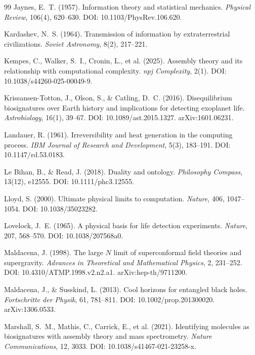 \documentclass[12pt, a4paper]{article}
\begin{document}
\begin{thebibliography}{99}
Jaynes, E.~T. (1957). Information theory and statistical mechanics. \textit{Physical Review},
106(4), 620--630. DOI: 10.1103/PhysRev.106.620.

Kardashev, N.~S. (1964). Transmission of information by extraterrestrial civilizations.
\textit{Soviet Astronomy}, 8(2), 217--221.

Kempes, C., Walker, S.~I., Cronin, L., et al. (2025). Assembly theory and its relationship
with computational complexity. \textit{npj Complexity}, 2(1).
DOI: 10.1038/s44260-025-00049-9.

Krissansen-Totton, J., Olson, S., \& Catling, D.~C. (2016). Disequilibrium biosignatures
over Earth history and implications for detecting exoplanet life. \textit{Astrobiology},
16(1), 39--67. DOI: 10.1089/ast.2015.1327. arXiv:1601.06231.

Landauer, R. (1961). Irreversibility and heat generation in the computing process.
\textit{IBM Journal of Research and Development}, 5(3), 183--191.
DOI: 10.1147/rd.53.0183.

Le Bihan, B., \& Read, J. (2018). Duality and ontology. \textit{Philosophy Compass},
13(12), e12555. DOI: 10.1111/phc3.12555.

Lloyd, S. (2000). Ultimate physical limits to computation. \textit{Nature}, 406, 1047--1054.
DOI: 10.1038/35023282.

Lovelock, J.~E. (1965). A physical basis for life detection experiments. \textit{Nature},
207, 568--570. DOI: 10.1038/207568a0.

Maldacena, J. (1998). The large $N$ limit of superconformal field theories and supergravity.
\textit{Advances in Theoretical and Mathematical Physics}, 2, 231--252.
DOI: 10.4310/ATMP.1998.v2.n2.a1. arXiv:hep-th/9711200.

Maldacena, J., \& Susskind, L. (2013). Cool horizons for entangled black holes.
\textit{Fortschritte der Physik}, 61, 781--811. DOI: 10.1002/prop.201300020.
arXiv:1306.0533.

Marshall, S.~M., Mathis, C., Carrick, E., et al. (2021). Identifying molecules as
biosignatures with assembly theory and mass spectrometry. \textit{Nature Communications},
12, 3033. DOI: 10.1038/s41467-021-23258-x.


\end{thebibliography}
\end{document}
